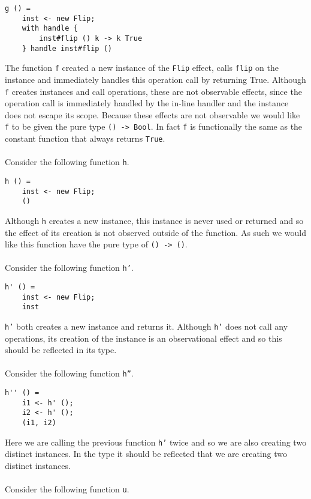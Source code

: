 \documentclass[12pt]{article}
\begin{document}
\begin{verbatim}
g () =
	inst <- new Flip;
	with handle {
		inst#flip () k -> k True
	} handle inst#flip ()
\end{verbatim}

The function \texttt{f} created a new instance of the \texttt{Flip} effect, calls \texttt{flip} on the instance and immediately handles this operation call by returning True. Although \texttt{f} creates instances and call operations, these are not observable effects, since the operation call is immediately handled by the in-line handler and the instance does not escape its scope.
Because these effects are not observable we would like \texttt{f} to be given the pure type \texttt{() -> Bool}.
In fact \texttt{f} is functionally the same as the constant function that always returns \texttt{True}.
\\\\
Consider the following function \texttt{h}.

\begin{verbatim}
h () =
	inst <- new Flip;
	()
\end{verbatim}

Although \texttt{h} creates a new instance, this instance is never used or returned and so the effect of its creation is not observed outside of the function. As such we would like this function have the pure type of \texttt{() -> ()}.
\\\\
Consider the following function \texttt{h'}.

\begin{verbatim}
h' () =
	inst <- new Flip;
	inst
\end{verbatim}

\texttt{h'} both creates a new instance and returns it. Although \texttt{h'} does not call any operations, its creation of the instance is an observational effect and so this should be reflected in its type.
\\\\
Consider the following function \texttt{h''}.

\begin{verbatim}
h'' () =
	i1 <- h' ();
	i2 <- h' ();
	(i1, i2)
\end{verbatim}

Here we are calling the previous function \texttt{h'} twice and so we are also creating two distinct instances.
In the type it should be reflected that we are creating two distinct instances.
\\\\
Consider the following function \texttt{u}.
\end{document}
